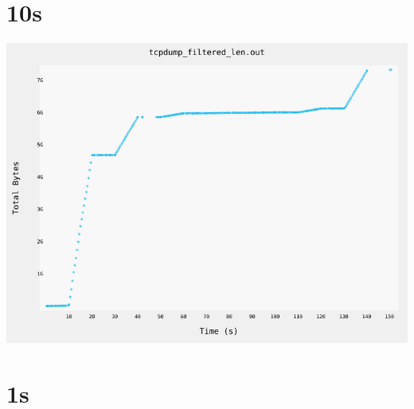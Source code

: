 \documentclass{article}
\begin{document}
\belowcaptionskip=-10pt


\section{10s}
    \noindent\begin{minipage}{.45\textwidth}
    
    \end{minipage}\hfill
    \begin{minipage}{.45\textwidth}
    
    \end{minipage}
    
    \begin{center}
        \includegraphics[angle=90]{set_c_10s/plot.png}
    \end{center}
\clearpage

\section{1s}
    \noindent\begin{minipage}{.45\textwidth}
    
    \end{minipage}\hfill
    \begin{minipage}{.45\textwidth}
    
    \end{minipage}
    
\end{document}
